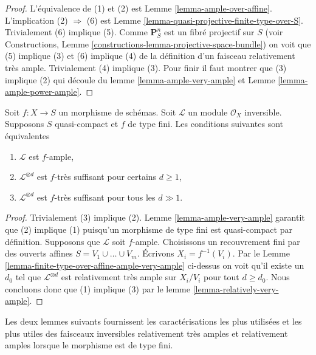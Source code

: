 \begin{proof}
L'équivalence de (1) et (2) est Lemme \ref{lemma-ample-over-affine}. L'implication
(2) $\Rightarrow$ (6) est Lemme
\ref{lemma-quasi-projective-finite-type-over-S}. Trivialement (6) implique (5).
Comme $\mathbf{P}^n_S$
est un fibré projectif sur $S$ (voir Constructions,
Lemme \ref{constructions-lemma-projective-space-bundle}) on voit que (5) implique
(3) et (6)
implique (4) de la définition d'un faisceau relativement
très ample.
Trivialement (4) implique (3). Pour finir il
faut montrer que (3) implique (2) qui découle du lemme
\ref{lemma-ample-very-ample} et Lemme \ref{lemma-ample-power-ample}.
\end{proof}

\begin{lemma}
\label{lemma-finite-type-ample-very-ample}
Soit $f : X \to S$ un morphisme de schémas. Soit $\mathcal{L}$
un module $\mathcal{O}_X$ inversible. Supposons $S$ quasi-compact
et $f$ de type fini. Les conditions
suivantes sont équivalentes
\begin{enumerate}
\item $\mathcal{L}$ est $f$-ample,
\item $\mathcal{L}^{\otimes d}$ est $f$-très suffisant pour certains $d \geq 1$,
\item $\mathcal{L}^{\otimes d}$ est $f$-très suffisant pour tous les $d \gg 1$.
\end{enumerate}
\end{lemma}

\begin{proof}
Trivialement (3) implique (2). Lemme \ref{lemma-ample-very-ample} garantit que (2) implique
(1) puisqu'un morphisme de type fini est quasi-compact
par définition. Supposons que $\mathcal{L}$ soit $f$-ample.
Choisissons un recouvrement fini par des ouverts affines $S = V_1 \cup \ldots \cup V_m$. Écrivons
$X_i = f^{-1}(V_i)$. Par le Lemme \ref{lemma-finite-type-over-affine-ample-very-ample} ci-dessus on voit qu'il existe
un $d_0$ tel que $\mathcal{L}^{\otimes d}$ est relativement
très ample sur $X_i/V_i$ pour tout $d \geq d_0$. Nous concluons
donc que (1) implique (3) par le lemme \ref{lemma-relatively-very-ample}.
\end{proof}

\noindent
Les deux lemmes suivants fournissent les caractérisations les plus utilisées
et les plus utiles des faisceaux inversibles relativement très amples
et relativement amples lorsque le morphisme est de type fini.

